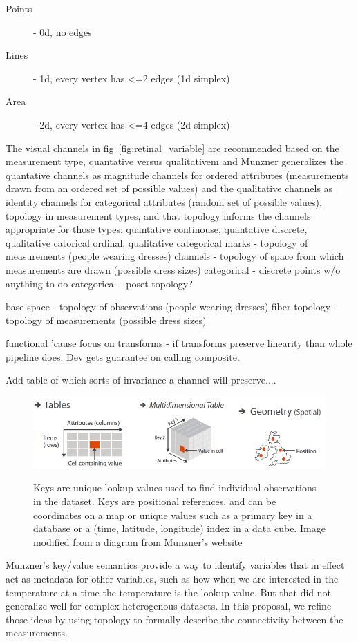 \documentclass[letterpaper,onecolumn,titlepage]{Ythesis}
\begin{document}
\begin{description} 
    \item[Points] - 0d, no edges
    \item[Lines] - 1d, every vertex has <=2 edges (1d simplex)
    \item[Area] - 2d,  every vertex has <=4 edges (2d simplex)
\end{description}

The visual channels in fig~\ref{fig:retinal_variable} are recommended based on the measurement type, quantative versus qualitativem  and Munzner generalizes the quantative channels as magnitude channels for ordered attributes (measurements drawn from an ordered set of possible values) and the qualitative channels as identity channels for categorical attributes (random set of possible values). 
topology in measurement types, and that topology informs the channels appropriate for those types:
    quantative continouse, quantative discrete, qualitative catorical ordinal, qualitative categorical
    marks - topology of measurements (people wearing dresses)
    channels - topology of space from which measurements are drawn (possible dress sizes)
    categorical - discrete points w/o anything to do 
    categorical - poset topology?

    base space - topology of observations (people wearing dresses)
    fiber topology - topology of measurements (possible dress sizes) 

functional 'cause focus on transforms - if transforms preserve linearity than whole pipeline does. Dev gets guarantee on calling composite. 

Add table of which sorts of invariance a channel will preserve....


\begin{figure}
    \includegraphics{figures/intro/munzner_datatypes}
    \label{fig:munzner_datatypes}
    \caption{Keys are unique lookup values used to find individual observations in the dataset. Keys are positional references, and can be coordinates on a map or unique values such as a primary key in a database or a (time, latitude, longitude) index in a data cube. Image modified from a diagram from Munzner's website\cite{munznerChDataAbstraction}}
\end{figure}
Munzner's key/value semantics\cite{munznerWhatDataAbstraction2014}
provide a way to identify variables that in effect act as metadata for other variables, such as how when we are interested in the temperature at a time the temperature is the lookup value. But that did not generalize well for complex heterogenous datasets. In this proposal, we refine those ideas by using topology to formally describe the connectivity between the measurements. 
\end{document}
